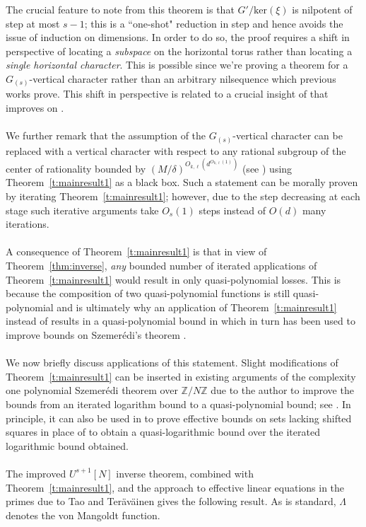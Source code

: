 \documentclass[11pt, a4paper]{amsart}
\theoremstyle{plain}
\theoremstyle{plain}
\theoremstyle{definition}
\theoremstyle{remark}
\numberwithin{equation}{section}
\numberwithin{lemma}{section}
\numberwithin{proposition}{section}
\numberwithin{corollary}{section}
\numberwithin{definition}{section}
\numberwithin{claim}{section}
\begin{document}
The crucial feature to note from this theorem is that $G'/\mathrm{ker}(\xi)$ is nilpotent of step at most $s - 1$; this is a ``one-shot" reduction in step and hence avoids the issue of induction on dimensions. In order to do so, the proof requires a shift in perspective of locating a \emph{subspace} on the horizontal torus rather than locating a \emph{single horizontal character}. This is possible since we're proving a theorem for a $G_{(s)}$-vertical character rather than an arbitrary nilsequence which previous works \cite{GT12, Lei05} prove. This shift in perspective is related to a crucial insight of \cite{LSS24b} that improves on \cite{GTZ12}. \\\\
We further remark that the assumption of the $G_{(s)}$-vertical character can be replaced with a vertical character with respect to any rational subgroup of the center of rationality bounded by $(M/\delta)^{O_{k, \ell}(d^{O_{k, \ell}(1)})}$ (see \cite[Theorem~5.5]{LSS24b}) using Theorem~\ref{t:mainresult1} as a black box. Such a statement can be morally proven by iterating Theorem~\ref{t:mainresult1}; however, due to the step decreasing at each stage such iterative arguments take $O_s(1)$ steps instead of $O(d)$ many iterations. \\\\
A consequence of Theorem~\ref{t:mainresult1} is that in view of Theorem~\ref{thm:inverse}, \emph{any} bounded number of iterated applications of Theorem~\ref{t:mainresult1} would result in only quasi-polynomial losses. This is because the composition of two quasi-polynomial functions is still quasi-polynomial and is ultimately why an application of Theorem~\ref{t:mainresult1} instead of \cite{GT12} results in a quasi-polynomial bound in \cite{LSS24b} which in turn has been used to improve bounds on Szemer{\'e}di's theorem \cite{LSS24c}. \\\\
We now briefly discuss applications of this statement. Slight modifications of Theorem~\ref{t:mainresult1} can be inserted in existing arguments of the complexity one polynomial Szemer\'edi theorem over $\mathbb{Z}/N\mathbb{Z}$ due to the author \cite{Len22} to improve the bounds from an iterated logarithm bound to a quasi-polynomial bound; see \cite{LenNew}. In principle, it can also be used in \cite{PSS23} to prove effective bounds on sets lacking shifted squares in place of \cite{GT12} to obtain a quasi-logarithmic bound over the iterated logarithmic bound obtained. \\\\
The improved $U^{s + 1}[N]$ inverse theorem, combined with Theorem~\ref{t:mainresult1}, and the approach to effective linear equations in the primes due to Tao and Ter{\"a}v{\"a}inen \cite{TT21} gives the following result. As is standard, $\Lambda$ denotes the von Mangoldt function. 
\end{document}
